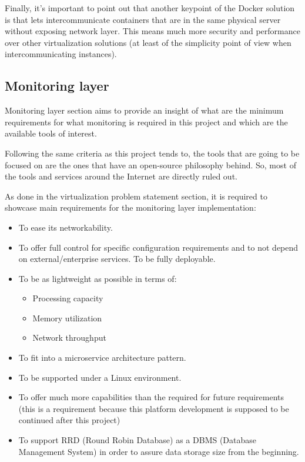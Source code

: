 Finally, it's important to point out that another keypoint of the Docker solution is that lets intercommunicate containers that are in the same physical server without exposing network layer. This means much more security and performance over other virtualization solutions (at least of the simplicity point of view when intercommunicating instances).

\subsection{Monitoring layer}

Monitoring layer section aims to provide an insight of what are the minimum requirements for what monitoring is required in this project and which are the available tools of interest.

Following the same criteria as this project tends to, the tools that are going to be focused on are the ones that have an open-source philosophy behind. So, most of the tools and services around the Internet are directly ruled out.

As done in the virtualization problem statement section, it is required to showcase main requirements for the monitoring layer implementation:

\begin{itemize}
\item To ease its networkability.
\item To offer full control for specific configuration requirements and to not depend on external/enterprise services. To be fully deployable.
\item To be as lightweight as possible in terms of:
\begin{itemize}
\item Processing capacity
\item Memory utilization
\item Network throughput
\end{itemize}
\item To fit into a microservice architecture pattern.
\item To be supported under a Linux environment.
\item To offer much more capabilities than the required for future requirements (this is a requirement because this platform development is supposed to be continued after this project)
\item To support RRD (Round Robin Database) as a DBMS (Database Management System) in order to assure data storage size from the beginning.
\end{itemize}


